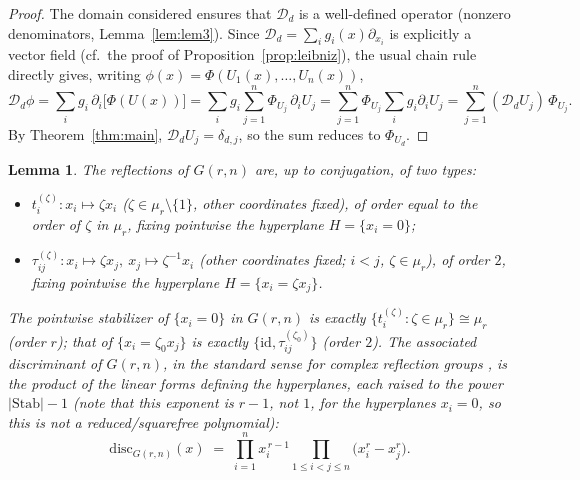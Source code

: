 \documentclass[10pt,a4paper]{amsart}
\newtheorem{lemma}[theorem]{Lemma}
\begin{document}
\begin{proof}
The domain considered ensures that $\mathcal D_d$ is a well-defined operator (nonzero denominators, Lemma~\ref{lem:lem3}). Since $\mathcal D_d=\sum_ig_i(x)\partial_{x_i}$ is explicitly a vector field (cf.\ the proof of Proposition~\ref{prop:leibniz}), the usual chain rule directly gives, writing $\phi(x)=\Phi(U_1(x),\dots,U_n(x))$,
\[
\mathcal D_d\phi = \sum_i g_i\,\partial_i\big[\Phi(U(x))\big] = \sum_i g_i\sum_{j=1}^n \Phi_{U_j}\,\partial_iU_j = \sum_{j=1}^n \Phi_{U_j}\sum_i g_i\partial_iU_j = \sum_{j=1}^n (\mathcal D_dU_j)\,\Phi_{U_j}.
\]
By Theorem~\ref{thm:main}, $\mathcal D_dU_j=\delta_{d,j}$, so the sum reduces to $\Phi_{U_d}$.
\end{proof}

\begin{lemma}\label{lem:disc}
The reflections of $G(r,n)$ are, up to conjugation, of two types:
\begin{itemize}
\item $t_i^{(\zeta)}: x_i\mapsto \zeta x_i$ ($\zeta\in\mu_r\setminus\{1\}$, other coordinates fixed), of order equal to the order of $\zeta$ in $\mu_r$, fixing pointwise the hyperplane $H=\{x_i=0\}$;
\item $\tau_{ij}^{(\zeta)}: x_i\mapsto \zeta x_j,\ x_j\mapsto \zeta^{-1}x_i$ (other coordinates fixed; $i<j$, $\zeta\in\mu_r$), of order $2$, fixing pointwise the hyperplane $H=\{x_i=\zeta x_j\}$.
\end{itemize}
The pointwise stabilizer of $\{x_i=0\}$ in $G(r,n)$ is exactly $\{t_i^{(\zeta)}:\zeta\in\mu_r\}\cong\mu_r$ (order $r$); that of $\{x_i=\zeta_0x_j\}$ is exactly $\{\mathrm{id},\tau_{ij}^{(\zeta_0)}\}$ (order $2$). The associated discriminant of $G(r,n)$, in the standard sense for complex reflection groups \cite[Ch.~2]{LT}, is the product of the linear forms defining the hyperplanes, each raised to the power $|\mathrm{Stab}|-1$ (note that this exponent is $r-1$, not $1$, for the hyperplanes $x_i=0$, so this is \emph{not} a reduced/squarefree polynomial):
\[
\mathrm{disc}_{G(r,n)}(x) \;=\; \prod_{i=1}^n x_i^{\,r-1} \prod_{1\le i<j\le n} \big(x_i^r - x_j^r\big).
\]
\end{lemma}
\end{document}
